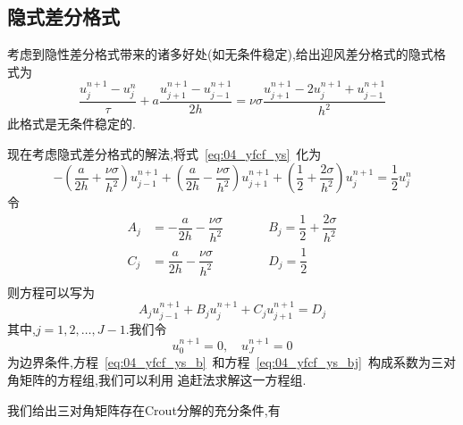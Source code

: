 \subsection{隐式差分格式}
考虑到隐性差分格式带来的诸多好处(如无条件稳定),给出迎风差分格式的隐式格式为
\begin{equation}\label{eq:04_yfcf_ys}
 \dfrac{u_j^{n+1}-u_j^n}{\tau}+a\dfrac{u_{j+1}^{n+1}-u_{j-1}^{n+1}}{2h}=\nu\sigma\dfrac{u_{j+1}^{n+1}
 -2u_j^{n+1}+u_{j-1}^{n+1}}{h^2}
\end{equation}
此格式是无条件稳定的.\par
现在考虑隐式差分格式的解法,将式~\ref{eq:04_yfcf_ys}~化为
\begin{equation*}
-\left(\dfrac{a}{2h}+\dfrac{\nu\sigma}{h^2}\right)u_{j-1}^{n+1}+\left(\dfrac{a}{2h}-\dfrac{\nu\sigma}{h^2}\right)u_{j+1}^{n+1}
+\left(\dfrac{1}{2}+\dfrac{2\sigma}{h^2}\right)u_j^{n+1}=\dfrac{1}{2}u_j^n
\end{equation*}
令
\begin{equation*}
\begin{aligned}
A_j &= -\dfrac{a}{2h}-\dfrac{\nu\sigma}{h^2} & \qquad & B_j = \dfrac{1}{2}+\dfrac{2\sigma}{h^2} \\[0.6em]
C_j &= \dfrac{a}{2h}-\dfrac{\nu\sigma}{h^2}  &  \qquad & D_j = \dfrac{1}{2}   \\
\end{aligned}
\end{equation*}
则方程可以写为
\begin{equation}\label{eq:04_yfcf_ys_b}
 A_j u_{j-1}^{n+1} + B_j u_j^{n+1} + C_j u_{j+1}^{n+1} = D_j
\end{equation}
其中,$j=1,2,\ldots,J-1$.我们令
\begin{equation}\label{eq:04_yfcf_ys_bj}
 u_0^{n+1}=0,\quad u_J^{n+1}=0
\end{equation}
为边界条件,方程~\ref{eq:04_yfcf_ys_b}~和方程~\ref{eq:04_yfcf_ys_bj}~构成系数为三对角矩阵的方程组,我们可以利用
追赶法求解这一方程组.\par
我们给出三对角矩阵存在Crout分解的充分条件,有
